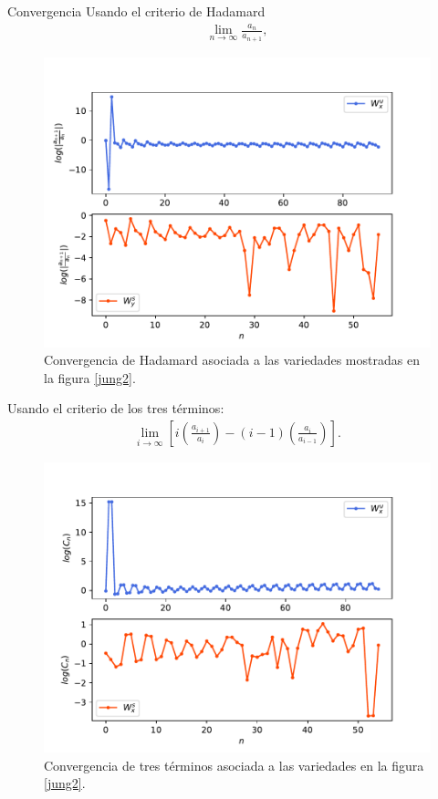 \documentclass[11pt]{beamer}
\theoremstyle{definition}
\begin{document}
\begin{frame}{Convergencia}
Usando el criterio de Hadamard
\begin{eqnarray}
\lim_{n\rightarrow\infty}\frac{a_{n}}{a_{n+1}},\label{hadamard}
\end{eqnarray} 
\begin{figure}
\centering
\includegraphics[scale=0.4]{convergenciaJungH57}
\caption{Convergencia de Hadamard asociada a las variedades mostradas en la figura \ref{jung2}.}
\label{convergenciaJH}
\end{figure}


\end{frame}
\begin{frame}
Usando el criterio de los tres t\'erminos:
\begin{eqnarray}
\lim_{i\rightarrow\infty} \left[ i\left(\frac{a_{i+1}}{a_{i}}\right)-(i-1)\left(\frac{a_{i}}{a_{i-1}}\right) \right].
\label{tres terminos}
\end{eqnarray}
\begin{figure}
\centering
\includegraphics[scale=0.4]{convergenciaJungT57}
\caption{Convergencia de tres términos asociada a las variedades en la figura \ref{jung2}.}
\label{convergenciaJ3}
\end{figure}
\end{frame}
\end{document}
